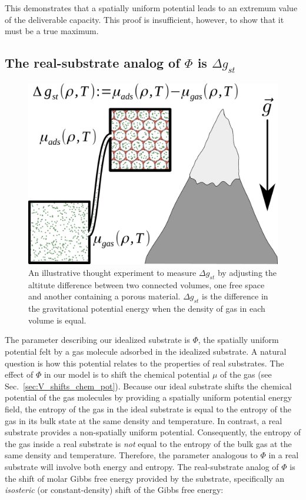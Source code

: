 \documentclass[pre,twocolumn]{revtex4-2}
\newcommand\V{\Phi}
\newcommand\gst{\ensuremath{\Delta g_{st}}}
\begin{document}
This demonstrates that a spatially uniform potential leads to an extremum value
of the deliverable capacity. This proof is insufficient, however, to show that
it must be a true maximum.

\subsection{The real-substrate analog of $\V$ is $\gst$}
\label{sec:phi-is-delta-g}
\begin{figure}
    \centering
    \includegraphics[width=\columnwidth]{g_st_simple.pdf}
    \caption{An illustrative thought experiment to measure $\gst$ by adjusting the altitute difference between two connected volumes, one free space and another containing a porous material.
    $\gst$ is the difference in the gravitational potential energy when the density of gas in each volume is equal.
    }
    \label{fig:delta-G-cartoon}
\end{figure}

The parameter describing our idealized substrate is $\V$, the spatially uniform
potential felt by a gas molecule adsorbed in the idealized substrate. A natural
question is how this potential relates to the properties of real substrates.
The effect of $\V$ in our model is to shift the chemical potential $\mu$ of the
gas (see Sec.~\ref{sec:V_shifts_chem_pot}). Because our ideal substrate shifts
the chemical potential of the gas molecules by providing a spatially uniform
potential energy field, the entropy of the gas in the ideal substrate is equal
to the entropy of the gas in its bulk state at the same density and
temperature. In contrast, a real substrate provides a non-spatially uniform
potential. Consequently, the entropy of the gas inside a real substrate is
\emph{not} equal to the entropy of the bulk gas at the same density and
temperature. Therefore, the parameter analogous to $\V$ in a real substrate
will involve both energy and entropy. The real-substrate analog of $\V$ is the
shift of molar Gibbs free energy provided by the substrate, specifically an
\emph{isosteric} (or constant-density) shift of the Gibbs free energy:
\end{document}
